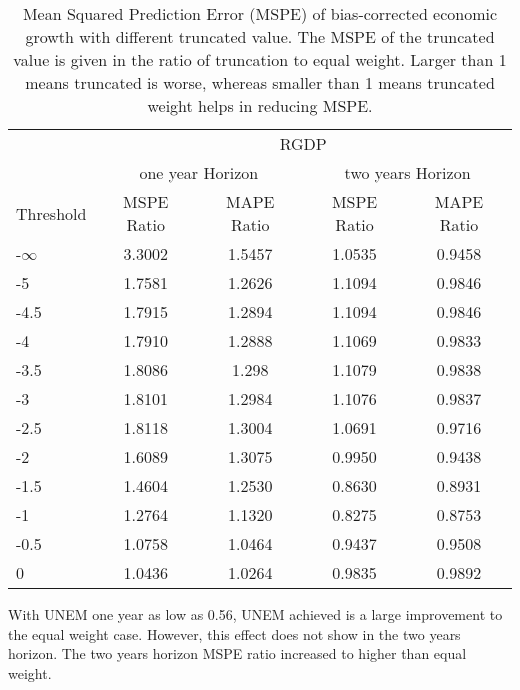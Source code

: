 \documentclass[11pt]{article}
\begin{document}
\begin{table}[!h]
	\centering
	\caption{Mean Squared Prediction Error (MSPE) of bias-corrected economic growth with different truncated value. The MSPE of the truncated value is given in the ratio of truncation to equal weight. Larger than 1 means truncated is worse, whereas smaller than 1 means truncated weight helps in reducing MSPE.}
	\label{tab: MSPE RGDP bias}
	\begin{tabular}{lcccc}
		\hline
		&                        \multicolumn{4}{c}{RGDP}                         \\
		\cmidrule(lr){2-5}                              & \multicolumn{2}{c}{one year Horizon} & \multicolumn{2}{c}{two years Horizon} \\
		\cmidrule(lr){2-3} \cmidrule(lr){4-5}
		Threshold & MSPE Ratio & MAPE Ratio  & MSPE Ratio & MAPE Ratio  \\ \hline
		-$\infty$ & 3.3002 & 1.5457 & 1.0535 & 0.9458\\ 
		-5 & 1.7581 & 1.2626 & 1.1094 & 0.9846\\ 
		-4.5 & 1.7915 & 1.2894 & 1.1094 & 0.9846\\ 
		-4 & 1.7910 & 1.2888 & 1.1069 & 0.9833\\ 
		-3.5 & 1.8086 & 1.298 & 1.1079 & 0.9838\\ 
		-3 & 1.8101 & 1.2984 & 1.1076 & 0.9837\\ 
		-2.5 & 1.8118 & 1.3004 & 1.0691 & 0.9716\\ 
		-2 & 1.6089 & 1.3075 & 0.9950 & 0.9438\\ 
		-1.5 & 1.4604 & 1.2530 & 0.8630 & 0.8931\\ 
		-1 & 1.2764 & 1.1320 & 0.8275 & 0.8753\\ 
		-0.5 & 1.0758 & 1.0464 & 0.9437 & 0.9508\\ 
		0 & 1.0436 & 1.0264 & 0.9835 & 0.9892\\ \hline
	\end{tabular}
\end{table}


With UNEM one year as low as 0.56, UNEM achieved is a large improvement to the equal weight case. However, this effect does not show in the two years horizon. The two years horizon MSPE ratio increased to higher than equal weight.
\end{document}
